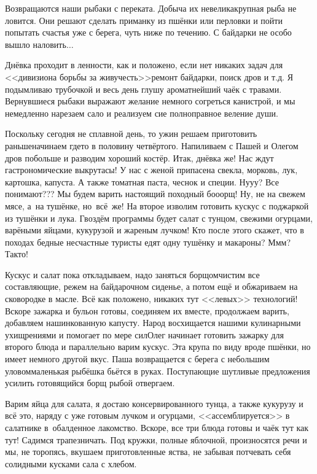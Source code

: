 Возвращаются наши рыбаки с переката. Добыча их невелика\mdash крупная рыба не ловится. Они решают сделать приманку из пшёнки или перловки и пойти попытать счастья уже с берега, чуть ниже по течению. С байдарки не особо вышло наловить$\ldots$

Днёвка проходит в ленности, как и положено, если нет никаких задач для <<дивизиона борьбы за живучесть>>\mdash ремонт байдарки, поиск дров и т.д. Я подымливаю трубочкой и весь день глушу ароматнейший чаёк с травами. Вернувшиеся рыбаки выражают желание немного согреться канистрой, и мы немедленно нарезаем сало и реализуем сие полноправное веление души.

Поскольку сегодня не сплавной день, то ужин решаем приготовить раньше\mdash начинаем где\sdash то в половину четвёртого. Напиливаем с Пашей и Олегом дров побольше и разводим хороший костёр. Итак, днёвка же! Нас ждут гастрономические выкрутасы! У нас с женой припасена свекла, морковь, лук, картошка, капуста. А также томатная паста, чеснок и специи. Ну\sdash у\sdash у? Все понимают??? Мы будем варить настоящий походный бо\sdash о\sdash орщ! Ну, не на свежем мясе, а~на тушёнке, но~всё~же! На второе изволим готовить кус\sdash кус с поджаркой из тушёнки и лука. Гвоздём программы будет салат с тунцом, свежими огурцами, варёными яйцами, кукурузой и жареным лучком! Кто после этого скажет, что в походах бедные несчастные туристы едят одну тушёнку и макароны? М\sdash м\sdash м? Так\sdash то!

Кус\sdash кус и салат пока откладываем, надо заняться борщом\mdash чистим все составляющие, режем на байдарочном сиденье, а потом ещё и обжариваем на сковородке в масле. Всё как положено, никаких тут <<левых>> технологий! Вскоре зажарка и бульон готовы, соединяем их вместе, продолжаем варить, добавляем нашинкованную капусту. Народ восхищается нашими кулинарными ухищрениями и помогает по мере сил\mdash Олег начинает готовить зажарку для второго блюда и параллельно варим кус\sdash кус. Эта крупа по виду вроде пшёнки, но имеет немного другой вкус. Паша возвращается с берега с небольшим уловом\mdash маленькая рыбёшка бьётся в руках. Поступающие шутливые предложения усилить готовящийся борщ рыбой отвергаем. 

Варим яйца для салата, я достаю консервированного тунца, а также кукурузу и всё это, наряду с уже готовым лучком и огурцами, <<ассемблируется>> в салатнике в~обалденное лакомство. Вскоре, все три блюда готовы и чаёк тут как тут! Садимся трапезничать. Под кружки, полные яблочной, произносятся речи и мы, не торопясь, вкушаем приготовленные яства, не забывая потчевать себя солидными кусками сала с хлебом. 


